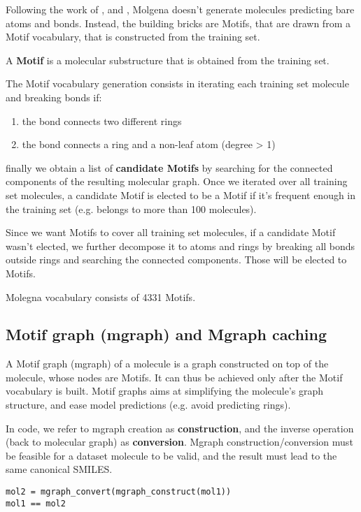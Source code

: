 \documentclass{article}
\begin{document}
Following the work of \cite{jtvae2019}, \cite{hievae2020} and \cite{microsoft2024}, Molgena doesn't generate molecules
predicting bare atoms and bonds. Instead, the building bricks are Motifs, that are drawn from a Motif vocabulary, that is
constructed from the training set.

A \textbf{Motif} is a molecular substructure that is obtained from the training set.

The Motif vocabulary generation consists in iterating each training set molecule and breaking bonds if:
\begin{enumerate}
\item the bond connects two different rings
\item the bond connects a ring and a non-leaf atom (degree > 1)
\end{enumerate}
finally we obtain a list of \textbf{candidate Motifs} by searching for the connected components of the resulting molecular graph.
Once we iterated over all training set molecules, a candidate Motif is elected to be a Motif if it's frequent enough in
the training set (e.g. belongs to more than 100 molecules).

Since we want Motifs to cover all training set molecules, if a candidate Motif wasn't elected, we further decompose
it to atoms and rings by breaking all bonds outside rings and searching the connected components. Those will be elected to
Motifs.

Molegna vocabulary consists of 4331 Motifs.

\subsection{Motif graph (mgraph) and Mgraph caching}

A Motif graph (mgraph) of a molecule is a graph constructed on top of the molecule, whose nodes are Motifs.
It can thus be achieved only after the Motif vocabulary is built.
Motif graphs aims at simplifying the molecule's graph structure, and ease model predictions (e.g. avoid predicting rings).

In code, we refer to mgraph creation as \textbf{construction}, and the inverse operation (back to molecular graph) as \textbf{conversion}.
Mgraph construction/conversion must be feasible for a dataset molecule to be valid, and the result must lead to the same canonical SMILES.

\begin{lstlisting}[linewidth=\linewidth]
mol2 = mgraph_convert(mgraph_construct(mol1))
mol1 == mol2
\end{lstlisting}
\end{document}
